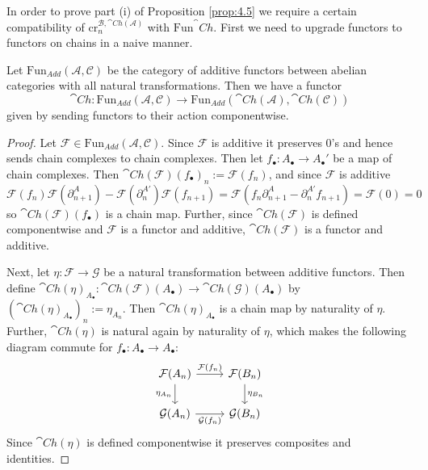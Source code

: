 In order to prove part (i) of Proposition \ref{prop:4.5} we require a certain compatibility of $\text{cr}_n^{\mathcal{B},\cat{Ch}(\mathcal{A})}$ with $\text{Fun}^\cat{Ch}$. First we need to upgrade functors to functors on chains in a naive manner.

\begin{lem}[label=lem:funcActChain]
    Let $\text{Fun}_{Add}(\mathcal{A},\mathcal{C})$ be the category of additive functors between abelian categories with all natural transformations. Then we have a functor
    \begin{equation*}
        \cat{Ch}:\text{Fun}_{Add}(\mathcal{A},\mathcal{C})\rightarrow \text{Fun}_{Add}(\cat{Ch}(\mathcal{A}),\cat{Ch}(\mathcal{C}))
    \end{equation*}
    given by sending functors to their action componentwise.
\end{lem}
\begin{proof}
    Let $\mathcal{F} \in \text{Fun}_{Add}(\mathcal{A},\mathcal{C})$. Since $\mathcal{F}$ is additive it preserves $0$'s and hence sends chain complexes to chain complexes. Then let $f_\bullet:A_\bullet\rightarrow A_\bullet'$ be a map of chain complexes. Then $\cat{Ch}(\mathcal{F})(f_\bullet)_n := \mathcal{F}(f_n)$, and since $\mathcal{F}$ is additive
    \begin{equation*}
        \mathcal{F}(f_n)\mathcal{F}(\partial_{n+1}^A)-\mathcal{F}(\partial_n^{A'})\mathcal{F}(f_{n+1}) = \mathcal{F}(f_n\partial_{n+1}^A-\partial_n^{A'}f_{n+1}) = \mathcal{F}(0) = 0
    \end{equation*}
    so $\cat{Ch}(\mathcal{F})(f_\bullet)$ is a chain map. Further, since $\cat{Ch}(\mathcal{F})$ is defined componentwise and $\mathcal{F}$ is a functor and additive, $\cat{Ch}(\mathcal{F})$ is a functor and additive. 


    Next, let $\eta:\mathcal{F}\rightarrow \mathcal{G}$ be a natural transformation between additive functors. Then define $\cat{Ch}(\eta)_{A_\bullet}:\cat{Ch}(\mathcal{F})(A_\bullet)\rightarrow \cat{Ch}(\mathcal{G})(A_\bullet)$ by $(\cat{Ch}(\eta)_{A_\bullet})_n := \eta_{A_n}$. Then $\cat{Ch}(\eta)_{A_\bullet}$ is a chain map by naturality of $\eta$. Further, $\cat{Ch}(\eta)$ is natural again by naturality of $\eta$, which makes the following diagram commute for $f_\bullet:A_\bullet\rightarrow A_\bullet$:
    \[\begin{tikzcd}
    	{\mathcal{F}(A_n)} & {\mathcal{F}(B_n)} \\
    	{\mathcal{G}(A_n)} & {\mathcal{G}(B_n)}
    	\arrow["{\eta_{A_n}}"', from=1-1, to=2-1]
    	\arrow["{\mathcal{G}(f_n)}"', from=2-1, to=2-2]
    	\arrow["{\eta_{B_n}}", from=1-2, to=2-2]
    	\arrow["{\mathcal{F}(f_n)}", from=1-1, to=1-2]
    \end{tikzcd}\]
    Since $\cat{Ch}(\eta)$ is defined componentwise it preserves composites and identities.
\end{proof}

